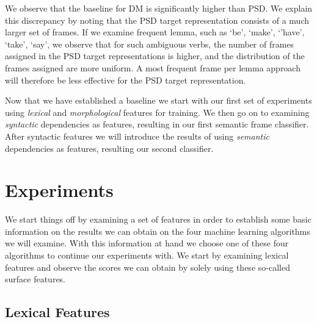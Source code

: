 We observe that the baseline for DM is significantly higher than PSD. We explain this discrepancy by noting that the PSD target representation consists of a much larger set of frames. If we examine frequent lemma, such as `be', `make', `'have', `take', `say', we observe that for such ambiguous verbs, the number of frames assigned in the PSD target representations is higher, and the distribution of the frames assigned are more uniform. A most frequent frame per lemma approach will therefore be less effective for the PSD target representation.

Now that we have established a baseline we start with our first set of experiments using \textit{lexical} and \textit{morphological} features for training. We then go on to examining \textit{syntactic} dependencies as features, resulting in our first semantic frame classifier. After syntactic features we will introduce the results of using \textit{semantic} dependencies as features, resulting our second classifier.



\section{Experiments}

We start things off by examining a set of features in order to establish some basic information on the results we can obtain on the four machine learning algorithms we will examine. With this information at hand we choose one of these four algorithms to continue our experiments with. We start by examining lexical features and observe the scores we can obtain by solely using these so-called surface features. 




\subsection{Lexical Features}
\label{results_lex}

